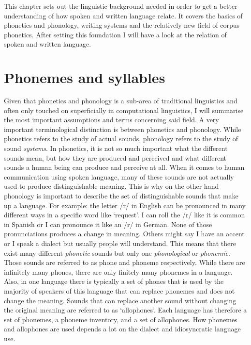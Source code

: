 \label{chap:ling-background}

This chapter sets out the linguistic background needed in order to get a better understanding of how spoken and written language relate. It covers the basics of phonetics and phonology, writing systems and the relatively new field of corpus phonetics. After setting this foundation I will have a look at the relation of spoken and written language. 


\section{Phonemes and syllables}
\label{phonology}
Given that phonetics and phonology is a sub-area of traditional linguistics and often only touched on superficially in computational linguistics, I will summarise the most important assumptions and terms concerning said field. A very important terminological distinction is between phonetics and phonology. While phonetics refers to the study of actual sounds, phonology refers to the study of sound \textit{systems}. In phonetics, it is not so much important what the different sounds mean, but how they are produced and perceived and what different sounds a human being can produce and perceive at all. When it comes to human communication using spoken language, many of these sounds are not actually used to produce distinguishable meaning. This is why on the other hand phonology is important to describe the set of distinguishable sounds that make up a language. For example: the letter /r/ in English can be pronounced in many different ways in a specific word like `request'. I can roll the /r/ like it is common in Spanish or I can pronounce it like an /r/ in German. None of those pronunciations produces a change in meaning. Others might say I have an accent or I speak a dialect but usually people will understand. This means that there exist many different \textit{phonetic} sounds but only one \textit{phonological} or \textit{phonemic}. Those sounds are referred to as phone and phoneme respectively. While there are infinitely many phones, there are only finitely many phonemes in a language. Also, in one language there is typically a set of phones that is used by the majority of speakers of this language that can replace phonemes and does not change the meaning. Sounds that can replace another sound without changing the original meaning are referred to as `allophones'. Each language has therefore a set of phonemes, a phoneme inventory, and a set of allophones. How phonemes and allophones are used depends a lot on the dialect and idiosyncratic language use.  


